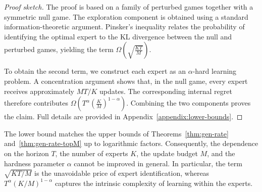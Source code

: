 \documentclass[a4paper,14pt]{extarticle}
\theoremstyle{plain}
\begin{document}
\begin{proof}[Proof sketch]
The proof is based on a family of perturbed games together with a symmetric null game. The exploration component is obtained using a standard information-theoretic argument. Pinsker's inequality relates the probability of identifying the optimal expert to the KL divergence between the null and perturbed games, yielding the term $\Omega\!\left(\sqrt{\frac{KT}{M}}\right)$.

To obtain the second term, we construct each expert as an $\alpha$-hard learning problem. A concentration argument shows that, in the null game, every expert receives approximately $MT/K$ updates. The corresponding internal regret therefore contributes
$ \Omega\!\left( T^\alpha \left(\frac{K}{M}\right)^{1-\alpha} \right)$.
Combining the two components proves the claim.
Full details are provided in Appendix~\ref{appendix:lower-bounds}.
\end{proof}

The lower bound matches the upper bounds of Theorems~\ref{thm:gen-rate} and~\ref{thm:gen-rate-topM} up to logarithmic factors.
Consequently, the dependence on the horizon $T$, the number of experts $K$, the update budget $M$, and the hardness parameter $\alpha$ cannot be improved in general. In particular, the term $\sqrt{KT/M}$ is the unavoidable price of expert identification, whereas $T^\alpha(K/M)^{1-\alpha}$ captures the intrinsic complexity of learning within the experts.
\end{document}
